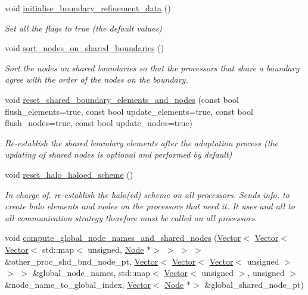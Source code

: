 \begin{DoxyCompactItemize}
void \hyperlink{classoomph_1_1RefineableTriangleMesh_a29588a5cec8225492e3c5816105c6c49}{initialise\+\_\+boundary\+\_\+refinement\+\_\+data} ()
\begin{DoxyCompactList}\small\item\em Set all the flags to true (the default values) \end{DoxyCompactList}\item 
void \hyperlink{classoomph_1_1RefineableTriangleMesh_a6ba5b8344a33bc5ad28e4bc5e8e59cb0}{sort\+\_\+nodes\+\_\+on\+\_\+shared\+\_\+boundaries} ()
\begin{DoxyCompactList}\small\item\em Sort the nodes on shared boundaries so that the processors that share a boundary agree with the order of the nodes on the boundary. \end{DoxyCompactList}\item 
void \hyperlink{classoomph_1_1RefineableTriangleMesh_a43f080841444e0d085669db4ae580f2f}{reset\+\_\+shared\+\_\+boundary\+\_\+elements\+\_\+and\+\_\+nodes} (const bool flush\+\_\+elements=true, const bool update\+\_\+elements=true, const bool flush\+\_\+nodes=true, const bool update\+\_\+nodes=true)
\begin{DoxyCompactList}\small\item\em Re-\/establish the shared boundary elements after the adaptation process (the updating of shared nodes is optional and performed by default) \end{DoxyCompactList}\item 
void \hyperlink{classoomph_1_1RefineableTriangleMesh_a9ba5601a6630b8c2c2ee75fe11d2c6be}{reset\+\_\+halo\+\_\+haloed\+\_\+scheme} ()
\begin{DoxyCompactList}\small\item\em In charge of. re-\/establish the halo(ed) scheme on all processors. Sends info. to create halo elements and nodes on the processors that need it. It uses and all to all communication strategy therefore must be called on all processors. \end{DoxyCompactList}\item 
void \hyperlink{classoomph_1_1RefineableTriangleMesh_a6f98720e48868896fd4360ee10ebdd09}{compute\+\_\+global\+\_\+node\+\_\+names\+\_\+and\+\_\+shared\+\_\+nodes} (\hyperlink{classoomph_1_1Vector}{Vector}$<$ \hyperlink{classoomph_1_1Vector}{Vector}$<$ \hyperlink{classoomph_1_1Vector}{Vector}$<$ std\+::map$<$ unsigned, \hyperlink{classoomph_1_1Node}{Node} $\ast$$>$ $>$ $>$ $>$ \&other\+\_\+proc\+\_\+shd\+\_\+bnd\+\_\+node\+\_\+pt, \hyperlink{classoomph_1_1Vector}{Vector}$<$ \hyperlink{classoomph_1_1Vector}{Vector}$<$ \hyperlink{classoomph_1_1Vector}{Vector}$<$ unsigned $>$ $>$ $>$ \&global\+\_\+node\+\_\+names, std\+::map$<$ \hyperlink{classoomph_1_1Vector}{Vector}$<$ unsigned $>$, unsigned $>$ \&node\+\_\+name\+\_\+to\+\_\+global\+\_\+index, \hyperlink{classoomph_1_1Vector}{Vector}$<$ \hyperlink{classoomph_1_1Node}{Node} $\ast$$>$ \&global\+\_\+shared\+\_\+node\+\_\+pt)

\end{DoxyCompactItemize}
